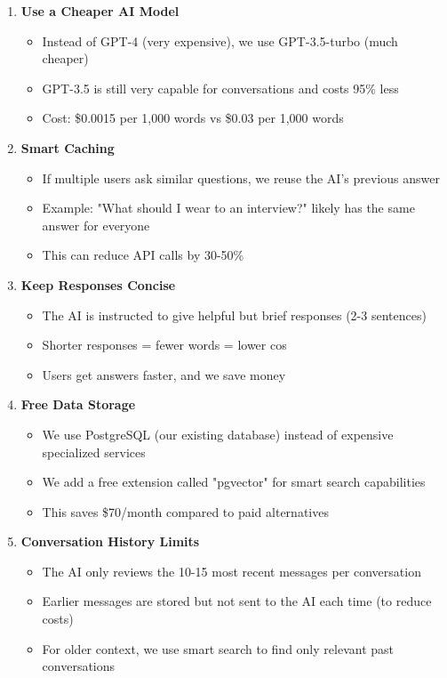 \documentclass[12pt,a4paper]{article}
\begin{document}
\begin{enumerate}
  \item \textbf{Use a Cheaper AI Model}

  \begin{itemize}
    \item Instead of GPT-4 (very expensive), we use GPT-3.5-turbo (much cheaper)
    \item GPT-3.5 is still very capable for conversations and costs 95\% less
    \item Cost: \$0.0015 per 1,000 words vs \$0.03 per 1,000 words
  \end{itemize}

  \item \textbf{Smart Caching}

  \begin{itemize}
    \item If multiple users ask similar questions, we reuse the AI's previous answer
    \item Example: "What should I wear to an interview?" likely has the same answer for everyone
    \item This can reduce API calls by 30-50\%
  \end{itemize}

  \item \textbf{Keep Responses Concise}

  \begin{itemize}
    \item The AI is instructed to give helpful but brief responses (2-3 sentences)
    \item Shorter responses = fewer words = lower cos
    \item Users get answers faster, and we save money
  \end{itemize}

  \item \textbf{Free Data Storage}

  \begin{itemize}
    \item We use PostgreSQL (our existing database) instead of expensive specialized services
    \item We add a free extension called "pgvector" for smart search capabilities
    \item This saves \$70/month compared to paid alternatives
  \end{itemize}

  \item \textbf{Conversation History Limits}

  \begin{itemize}
    \item The AI only reviews the 10-15 most recent messages per conversation
    \item Earlier messages are stored but not sent to the AI each time (to reduce costs)
    \item For older context, we use smart search to find only relevant past conversations
  \end{itemize}
\end{enumerate}
\end{document}
